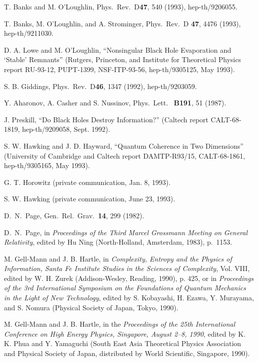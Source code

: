 \begin{thebibliography}{999}
 T. Banks and M. O'Loughlin,  Phys.\ Rev.\ D{\bf 47},
540
(1993),
hep-th/9206055.

 T. Banks, M. O'Loughlin, and A. Strominger, Phys.\
Rev.\ D
{\bf 47}, 4476 (1993), hep-th/9211030.

 D. A. Lowe and M. O'Loughlin, ``Nonsingular Black Hole
Evaporation and `Stable' Remnants''
(Rutgers, Princeton, and Institute for Theoretical Physics report
RU-93-12, PUPT-1399, NSF-ITP-93-56, hep-th/9305125, May 1993).

 S. B. Giddings,  Phys.\ Rev.\ D{\bf46}, 1347 (1992),
hep-th/9203059.

 Y. Aharonov, A. Casher and S. Nussinov,  Phys.\ Lett.\
{\bf
B191}, 51 (1987).

 J. Preskill, ``Do Black Holes Destroy Information?''
(Caltech
report CALT-68-1819, hep-th/9209058, Sept. 1992).

 S. W. Hawking and J. D. Hayward, ``Quantum Coherence
in Two Dimensions'' (University of Cambridge and Caltech report
DAMTP-R93/15, CALT-68-1861, hep-th/9305165, May 1993).

 G. T. Horowitz (private communication, Jan. 8,
1993).

 S. W. Hawking (private communication, June 23,
1993).

 D.\ N.\ Page, Gen.\ Rel.\ Grav.\ {\bf 14}, 299
(1982).

 D.\ N.\ Page, in {\em Proceedings of the Third Marcel
Grossmann
Meeting on General Relativity}, edited by Hu Ning (North-Holland,
Amsterdam,
1983), p.~1153.

 M. Gell-Mann and J. B. Hartle, in {\em
Complexity, Entropy and the Physics of Information, Santa
Fe Institute Studies in the Sciences of Complexity}, Vol. VIII,
edited by W. H. Zurek (Addison-Wesley, Reading, 1990), p.
425, or in {\em Proceedings of the 3rd International
Symposium on the Foundations of Quantum Mechanics in
the Light of New Technology}, edited by S. Kobayashi, H.
Ezawa, Y. Murayama, and S. Nomura (Physical Society of
Japan, Tokyo, 1990).

 M. Gell-Mann and J. B. Hartle, in the {\em
Proceedings of the 25th International Conference on High
Energy Physics, Singapore, August 2--8, 1990}, edited by K.
K. Phua and Y. Yamaguchi (South East Asia Theoretical
Physics Association and Physical Society of Japan,
distributed by World Scientific, Singapore, 1990).


\end{thebibliography}
